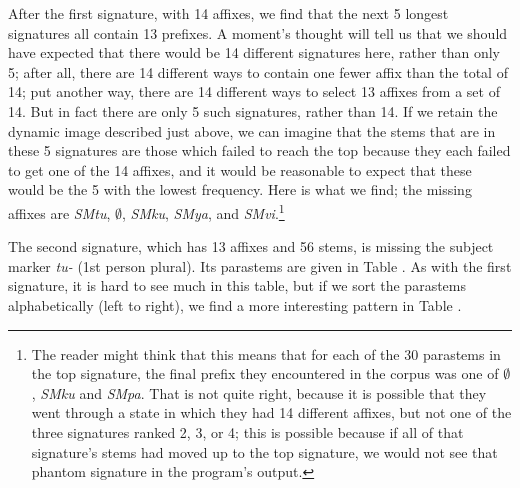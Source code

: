 \documentclass[output=paper,colorlinks,citecolor=brown,
]{langscibook}
\newcommand{\SM}{{\color{red}SM}}
\begin{document}
 
 
After the first signature, with 14 affixes, we find that the next 5 longest signatures all contain 13 prefixes. A moment's thought will tell us that we should have expected that there would be 14 different signatures here, rather than only 5; after all, there are 14 different ways to contain one fewer affix than the total of 14; put another way, there are 14 different ways to select 13 affixes from a set of 14. But in fact there are only 5 such signatures, rather than 14. If we retain the dynamic image described just above, we can imagine that the stems that are in these 5 signatures are those which failed to reach the top because they each failed to get one of the 14 affixes, and it would be reasonable to expect that these would be the 5 with the lowest frequency. Here is what we find; the missing affixes are \textit{\SM{tu}}, $\emptyset$, \textit{\SM{ku}}, \textit{\SM{ya}}, and \textit{\SM{vi}}.\footnote{The reader might think that this means that for each of the 30 parastems in the top signature, the final prefix they encountered in the corpus was one of $\emptyset$, \textit{\SM{ku}} and \textit{\SM{pa}}. That is not quite right, because it is possible that they went through a state in which they had 14 different affixes, but not one of the three signatures ranked 2, 3, or 4; this is possible because if all of that signature's stems had moved up to the top signature, we would not see that phantom signature in the program's output.}  
  
The second signature, which has 13 affixes and 56 stems, is missing the subject marker \textit{tu-} (1st person plural). Its parastems are given in Table . As with the first signature, it is hard to see much in this table, but if we sort the parastems alphabetically (left to right), we find a more interesting pattern in Table .
\end{document}
